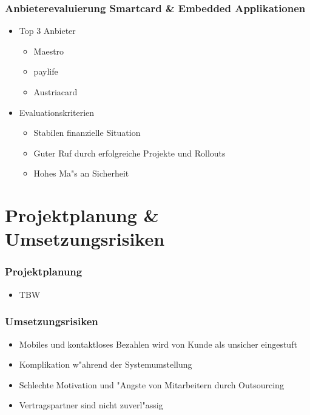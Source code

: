 \documentclass{beamer}
\begin{document}
\begin{frame}
  \frametitle{Anbieterevaluierung Smartcard \& Embedded Applikationen}
  \begin{itemize}

	\item Top 3 Anbieter
		\begin{itemize}
			\item Maestro
			\item paylife
			\item Austriacard\vspace{2mm}
		\end{itemize}

	\item Evaluationskriterien
		\begin{itemize}
			\item Stabilen finanzielle Situation
			\item Guter Ruf durch erfolgreiche Projekte und Rollouts
			\item Hohes Ma"s an Sicherheit
		\end{itemize}	
		
  \end{itemize}
\end{frame}

\section{Projektplanung \& Umsetzungsrisiken}

\begin{frame}
  \frametitle{Projektplanung}
  \begin{itemize}

	\item TBW

  \end{itemize}
\end{frame}

\begin{frame}
  \frametitle{Umsetzungsrisiken}
  \begin{itemize}

	\item Mobiles und kontaktloses Bezahlen wird von Kunde als unsicher eingestuft \vspace{2mm}
	\item Komplikation w"ahrend der Systemumstellung\vspace{2mm}
	\item Schlechte Motivation und "Angste von Mitarbeitern durch Outsourcing\vspace{2mm}
	\item Vertragspartner sind nicht zuverl"assig

  \end{itemize}
\end{frame}
\end{document}
